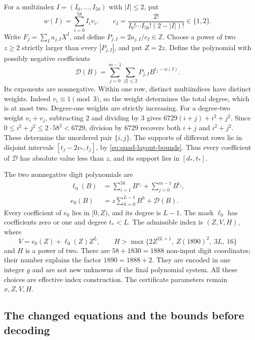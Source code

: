 For a multiindex $I=(I_0,\ldots,I_{58})$ with $|I|\le2$, put
\[
 w(I)=\sum_{i=0}^{58}I_i v_i,
 \qquad c_I=\frac{2!}{I_0!\cdots I_{58}!(2-|I|)!}\in\{1,2\}.
\]
Write $F_j=\sum_I a_{j,I}X^I$, and define
$P_{j,I}=2a_{j,I}/c_I\in\mathbb Z$. Choose a power of two $z\ge2$
strictly larger than every $|P_{j,I}|$, and put $Z=2z$.
Define the polynomial with possibly negative coefficients
\[
 \mathcal D(B)=\sum_{j=0}^{m-1}\sum_{|I|\le2}
        P_{j,I}B^{t_j-w(I)}.
\]
Its exponents are nonnegative. Within one row, distinct multiindices
have distinct weights. Indeed $v_i\equiv1\pmod3$, so the weight
determines the total degree, which is at most two. Degree-one weights
are strictly increasing. For a degree-two weight $v_i+v_j$, subtracting
$2$ and dividing by $3$ gives $6729(i+j)+i^2+j^2$. Since
$0\le i^2+j^2\le2\cdot58^2<6729$, division by $6729$ recovers both
$i+j$ and $i^2+j^2$. These determine the unordered pair $\{i,j\}$.
The supports of different rows lie in disjoint intervals
$[t_j-2v_*,t_j]$, by \eqref{eq:quad-layout-bounds}. Thus every
coefficient of $\mathcal D$ has absolute value less than $z$, and its
support lies in $[d_*,t_*]$.

The two nonnegative digit polynomials are
\begin{align*}
 \ell_0(B)&=\sum_{i=1}^{58}B^{v_i}+\sum_{j=0}^{m-1}B^{t_j},\\
 e_0(B)&=z\sum_{h=0}^{L-1}B^h+\mathcal D(B).
\end{align*}
Every coefficient of $e_0$ lies in $[0,Z)$, and its degree is $L-1$.
The mask $\ell_0$ has coefficients zero or one and degree $t_*<L$.
The admissible index is $(Z,V,H)$, where
\begin{equation}\label{eq:quad-index}
 V=e_0(Z)+\ell_0(Z)Z^L,\qquad
 H>\max\{2Z^{2L+1},\ Z(1890)^2,\ 3L,\ 16\}
\end{equation}
and $H$ is a power of two. There are $58+1830=1888$ non-input digit
coordinates; their number explains the factor $1890=1888+2$.
They are encoded in one integer $g$ and are not new unknowns of the
final polynomial system. All these choices are effective index
construction. The certificate parameters remain $x,Z,V,H$.

\subsection{The changed equations and the bounds before decoding}

